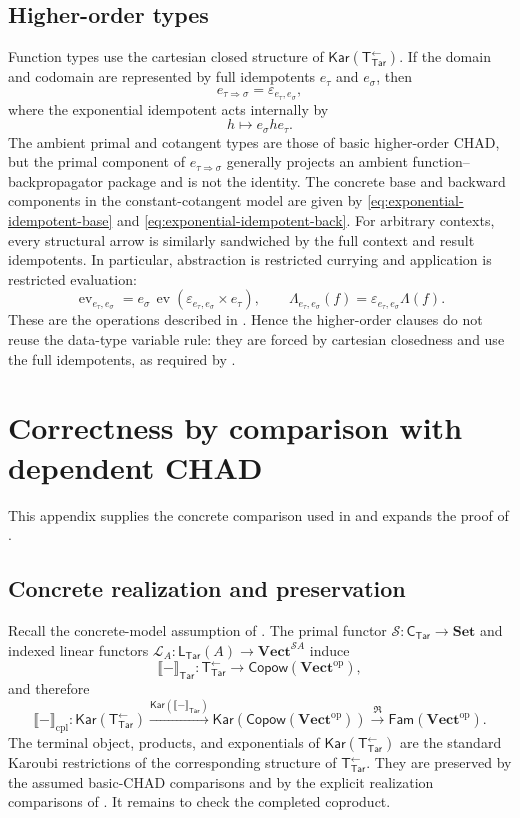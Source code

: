 \documentclass[runningheads,envcountsame]{llncs}
\newcommand{\Set}{\mathbf{Set}}
\newcommand{\Vect}{\mathbf{Vect}}
\newcommand{\Vectop}{\mathbf{Vect}^{\mathrm{op}}}
\newcommand{\Tar}{\mathsf{Tar}}
\newcommand{\CTar}{\mathsf C_{\Tar}}
\newcommand{\LTar}{\mathsf L_{\Tar}}
\newcommand{\TotTar}{\mathsf T_{\Tar}^{\leftarrow}}
\newcommand{\Copow}{\mathsf{Copow}}
\newcommand{\Fam}{\mathsf{Fam}}
\newcommand{\Kar}{\mathsf{Kar}}
\newcommand{\Rlz}{\mathfrak R}
\begin{document}
\subsection{Higher-order types}

Function types use the cartesian closed structure of $\Kar(\TotTar)$. If the domain and codomain are represented by full idempotents $e_\tau$ and $e_\sigma$, then
$$
e_{\tau\Rightarrow\sigma}=\varepsilon_{e_\tau,e_\sigma},
$$
where the exponential idempotent acts internally by
$$
h\longmapsto e_\sigma h e_\tau.
$$
The ambient primal and cotangent types are those of basic higher-order CHAD, but the primal component of $e_{\tau\Rightarrow\sigma}$ generally projects an ambient function--backpropagator package and is not the identity. The concrete base and backward components in the constant-cotangent model are given by \eqref{eq:exponential-idempotent-base} and \eqref{eq:exponential-idempotent-back}. For arbitrary contexts, every structural arrow is similarly sandwiched by the full context and result idempotents. In particular, abstraction is restricted currying and application is restricted evaluation:
$$
\operatorname{ev}_{e_\tau,e_\sigma}
=
e_\sigma\,\operatorname{ev}(\varepsilon_{e_\tau,e_\sigma}\times e_\tau),
\qquad
\Lambda_{e_\tau,e_\sigma}(f)=\varepsilon_{e_\tau,e_\sigma}\Lambda(f).
$$
These are the operations described in . Hence the higher-order clauses do not reuse the data-type variable rule: they are forced by cartesian closedness and use the full idempotents, as required by .

\section{Correctness by comparison with dependent CHAD}
\label{app:correctness}

This appendix supplies the concrete comparison used in
 and expands the proof
of .

\subsection{Concrete realization and preservation}
\label{app:concrete-comparison}

Recall the concrete-model assumption of . The primal
functor $\mathcal S:\CTar\to\Set$ and indexed linear functors
$\mathcal L_A:\LTar(A)\to\Vect^{\mathcal S A}$ induce
$$
\llbracket-\rrbracket_\Tar:\TotTar\longrightarrow\Copow(\Vectop),
$$
and therefore
$$
\llbracket-\rrbracket_{\mathrm{cpl}}:
\Kar(\TotTar)
\xrightarrow{\Kar(\llbracket-\rrbracket_\Tar)}
\Kar(\Copow(\Vectop))
\xrightarrow{\Rlz}
\Fam(\Vectop).
$$
The terminal object, products, and exponentials of $\Kar(\TotTar)$ are the
standard Karoubi restrictions of the corresponding structure of $\TotTar$.
They are preserved by the assumed basic-CHAD comparisons and by the explicit
realization comparisons of . It remains to
check the completed coproduct.
\end{document}
